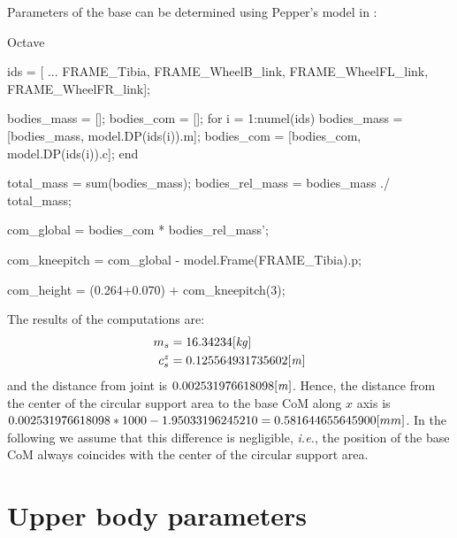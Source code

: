 Parameters of the base can be determined using Pepper's model in :
%
\begin{listingtcb}{Octave}
\begin{deflisting}
ids = [ ...
FRAME_Tibia, FRAME_WheelB_link, FRAME_WheelFL_link, FRAME_WheelFR_link];

bodies_mass = [];
bodies_com  = [];
for i = 1:numel(ids)
    bodies_mass = [bodies_mass, model.DP(ids(i)).m];
    bodies_com = [bodies_com, model.DP(ids(i)).c];
end

total_mass = sum(bodies_mass);
bodies_rel_mass = bodies_mass ./ total_mass;

com_global = bodies_com * bodies_rel_mass';

com_kneepitch = com_global - model.Frame(FRAME_Tibia).p;

com_height = (0.264+0.070) + com_kneepitch(3);
\end{deflisting}
\end{listingtcb}
%
The results of the computations are:
%
\begin{align}
    m_{s}       &=  16.34234 \mathit{[kg]}\\
    c_{s}^{z}   &=  0.125564931735602 \mathit{[m]}
\end{align}
%
and the distance from  joint is $0.002531976618098 \mathit{[m]}$.
Hence, the distance from the center of the circular support area to the base
CoM along $x$ axis is $0.002531976618098*1000 - 1.95033196245210 =
0.581644655645900 \mathit{[}mm]$. In the following we assume that this difference is
negligible, \emph{i.e.}, the position of the base CoM always coincides with the
center of the circular support area.


\section{Upper body parameters}

